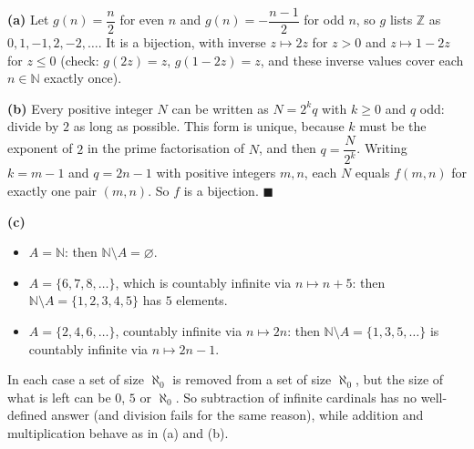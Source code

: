 \textbf{(a)} Let $g(n)=\dfrac n2$ for even $n$ and $g(n)=-\dfrac{n-1}{2}$ for odd $n$, so $g$ lists $\mathbb Z$ as $0,1,-1,2,-2,\dots$. It is a bijection, with inverse $z\mapsto2z$ for $z>0$ and $z\mapsto1-2z$ for $z\le0$ (check: $g(2z)=z$, $g(1-2z)=z$, and these inverse values cover each $n\in\mathbb N$ exactly once).

\textbf{(b)} Every positive integer $N$ can be written as $N=2^{k}q$ with $k\ge0$ and $q$ odd: divide by $2$ as long as possible. This form is unique, because $k$ must be the exponent of $2$ in the prime factorisation of $N$, and then $q=\dfrac{N}{2^k}$. Writing $k=m-1$ and $q=2n-1$ with positive integers $m,n$, each $N$ equals $f(m,n)$ for exactly one pair $(m,n)$. So $f$ is a bijection. $\blacksquare$

\textbf{(c)}
\begin{itemize}
\item $A=\mathbb N$: then $\mathbb N\setminus A=\varnothing$.
\item $A=\{6,7,8,\dots\}$, which is countably infinite via $n\mapsto n+5$: then $\mathbb N\setminus A=\{1,2,3,4,5\}$ has $5$ elements.
\item $A=\{2,4,6,\dots\}$, countably infinite via $n\mapsto2n$: then $\mathbb N\setminus A=\{1,3,5,\dots\}$ is countably infinite via $n\mapsto2n-1$.
\end{itemize}
In each case a set of size $\aleph_0$ is removed from a set of size $\aleph_0$, but the size of what is left can be $0$, $5$ or $\aleph_0$. So subtraction of infinite cardinals has no well-defined answer (and division fails for the same reason), while addition and multiplication behave as in (a) and (b).

